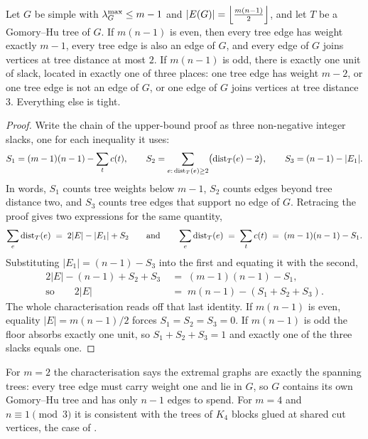 \begin{theorem}\label{thm:extremal-char}
Let $G$ be simple with $\lambda^{\max}_G \le m-1$ and $|E(G)| = \left\lfloor \frac{m(n-1)}{2} \right\rfloor$, and let $T$ be a Gomory--Hu tree of $G$. If $m(n-1)$ is even, then every tree edge has weight exactly $m-1$, every tree edge is also an edge of $G$, and every edge of $G$ joins vertices at tree distance at most $2$. If $m(n-1)$ is odd, there is exactly one unit of slack, located in exactly one of three places: one tree edge has weight $m-2$, or one tree edge is not an edge of $G$, or one edge of $G$ joins vertices at tree distance $3$. Everything else is tight.
\end{theorem}

\begin{proof}
Write the chain of the upper-bound proof as three non-negative integer slacks, one for each inequality it uses:
\[
    S_1 = (m-1)(n-1) - \sum_t c(t),
    \qquad
    S_2 = \sum_{e :\, \operatorname{dist}_T(e) \ge 2} \bigl(\operatorname{dist}_T(e) - 2\bigr),
    \qquad
    S_3 = (n-1) - |E_1| .
\]
In words, $S_1$ counts tree weights below $m-1$, $S_2$ counts edges beyond tree distance two, and $S_3$ counts tree edges that support no edge of $G$. Retracing the proof gives two expressions for the same quantity,
\[
    \sum_e \operatorname{dist}_T(e) \;=\; 2|E| - |E_1| + S_2
    \qquad\text{and}\qquad
    \sum_e \operatorname{dist}_T(e) \;=\; \sum_t c(t) \;=\; (m-1)(n-1) - S_1 .
\]
Substituting $|E_1| = (n-1) - S_3$ into the first and equating it with the second,
\[
\begin{aligned}
    2|E| - (n-1) + S_2 + S_3 &\;=\; (m-1)(n-1) - S_1, \\[2pt]
    \text{so}\qquad 2|E| &\;=\; m(n-1) - (S_1 + S_2 + S_3).
\end{aligned}
\]
The whole characterisation reads off that last identity. If $m(n-1)$ is even, equality $|E| = m(n-1)/2$ forces $S_1 = S_2 = S_3 = 0$. If $m(n-1)$ is odd the floor absorbs exactly one unit, so $S_1 + S_2 + S_3 = 1$ and exactly one of the three slacks equals one.
\end{proof}

For $m = 2$ the characterisation says the extremal graphs are exactly the spanning trees: every tree edge must carry weight one and lie in $G$, so $G$ contains its own Gomory--Hu tree and has only $n-1$ edges to spend. For $m = 4$ and $n \equiv 1 \pmod{3}$ it is consistent with the trees of $K_4$ blocks glued at shared cut vertices, the case of .

